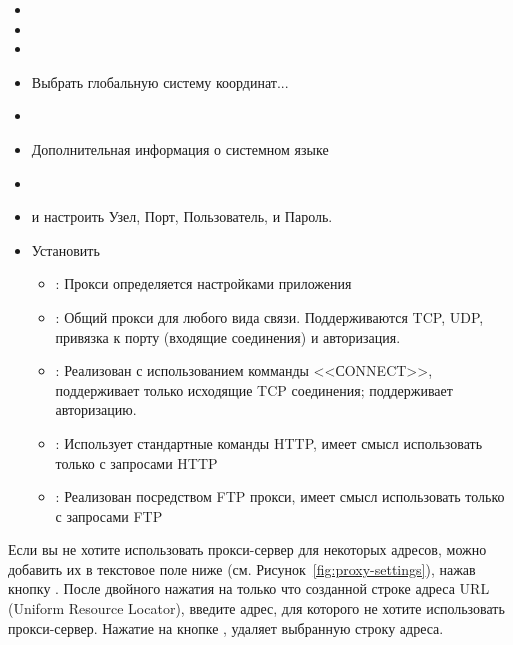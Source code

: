 
\begin{itemize}
\item {}
\item {}
\item {}
\item Выбрать глобальную систему координат...
\end{itemize}


\begin{itemize}
\item {}
\item Дополнительная информация о системном языке
\end{itemize}


\begin{itemize}
\item {}
\item {} и
настроить Узел, Порт, Пользователь, и Пароль.
\item Установить 
 \begin{itemize}
  \item {}: Прокси определяется настройками
  приложения
  \item {}: Общий прокси для любого вида связи.
  Поддерживаются TCP, UDP, привязка к порту (входящие соединения) и
  авторизация.
  \item {}: Реализован с использованием комманды
  <<СONNECT>>, поддерживает только исходящие TCP соединения; поддерживает
  авторизацию.
  \item {}: Использует стандартные команды
  HTTP, имеет смысл использовать только с запросами HTTP
  \item {}: Реализован посредством FTP прокси,
  имеет смысл использовать только с запросами FTP
 \end{itemize}
\end{itemize}

Если вы не хотите использовать прокси-сервер для некоторых адресов, можно
добавить их в текстовое поле ниже (см. Рисунок~\ref{fig:proxy-settings}),
нажав кнопку . После двойного нажатия на только что
созданной строке адреса URL (Uniform Resource Locator), введите адрес,
для которого не хотите использовать прокси-сервер. Нажатие на кнопке
, удаляет выбранную строку адреса.

